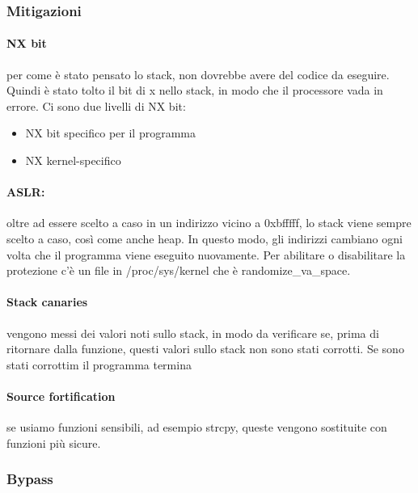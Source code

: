 \documentclass{article}
\begin{document}
\subsubsection{Mitigazioni}
\paragraph{NX bit} per come è stato pensato lo stack, non dovrebbe avere del codice da eseguire. Quindi è stato tolto il bit di x nello stack, in modo che il processore vada in errore. Ci sono due livelli di NX bit:
\begin{itemize}
\item NX bit specifico per il programma
\item NX kernel-specifico
\end{itemize}
\paragraph{ASLR:}oltre ad essere scelto a caso in un indirizzo vicino a 0xbfffff, lo stack viene sempre scelto a caso, così come anche heap. In questo modo, gli indirizzi cambiano ogni volta che il programma viene eseguito nuovamente. Per abilitare o disabilitare la protezione c'è un file in \textsf{/proc/sys/kernel} che è randomize\_va\_space.
\paragraph{Stack canaries}vengono messi dei valori noti sullo stack, in modo da verificare se, prima di ritornare dalla funzione, questi valori sullo stack non sono stati corrotti. Se sono stati corrottim il programma termina
\paragraph{Source fortification}se usiamo funzioni sensibili, ad esempio strcpy, queste vengono sostituite con funzioni più sicure.
\subsubsection{Bypass}
\end{document}
